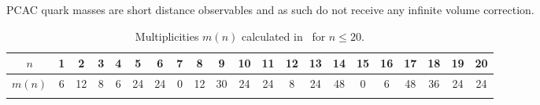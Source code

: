 PCAC quark masses are short distance observables and as such do not receive any infinite volume correction.

\vspace{2cm}

\begin{longtable}{c c c c c c c c c c c c c c c c c c c c c}
\toprule
$n$ & 1 & 2 & 3 & 4 & 5 & 6 & 7 & 8 & 9 & 10 & 11 & 12 & 13 & 14 & 15 & 16 & 17 & 18 & 19 & 20 \\
\midrule
$m(n)$ & 6 & 12 & 8 & 6 & 24 & 24 & 0 & 12 & 30 & 24 & 24 & 8 & 24 & 48 & 0 & 6 & 48 & 36 & 24 & 24 \\
\bottomrule
\caption{Multiplicities $m(n)$ calculated in~\citep{Colangelo:2003hf} for $n\leq20$.}
\label{apex_fv:tab:mn}
\end{longtable}


